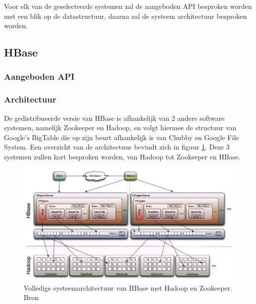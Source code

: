Voor elk van de geselecteerde systemen zal de aangeboden API besproken worden met een blik op de datastructuur, daarna zal de systeem architectuur besproken worden. 

\subsection{HBase}

\subsubsection{Aangeboden API} \todo{}

\subsubsection{Architectuur}
De gedistribueerde versie van HBase\cite{george2011hbase} is afhankelijk van 2 andere software systemen, namelijk Zookeeper\cite{hunt2010zookeeper} en Hadoop\cite{borthakur2007hadoop}, en volgt hiermee de structuur van Google's BigTable\cite{chang2008bigtable} die op zijn beurt afhankelijk is van Chubby\cite{burrows2006chubby} en Google File System\cite{ghemawat2003google}. Een overzicht van de architectuur bevindt zich in figuur \ref{fig:Hbase-structure}. Deze 3 systemen zullen kort besproken worden, van Hadoop tot Zookeeper en HBase. 

\begin{figure}[h!]
\centering
\includegraphics[width=\linewidth]{img/Hbase-structure.png}
\caption{Volledige systeemarchitectuur van HBase met Hadoop en Zookeeper. Bron \cite{ChinHBaseComprehensive}}
\label{fig:Hbase-structure}
\end{figure}

